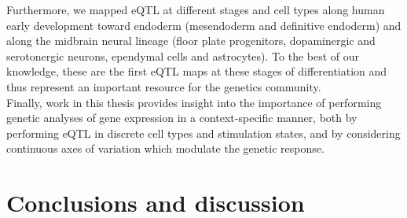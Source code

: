 Furthermore, we mapped eQTL at different stages and cell types along human early development toward endoderm (mesendoderm and definitive endoderm) and along the midbrain neural lineage (floor plate progenitors, dopaminergic and serotonergic neurons, ependymal cells and astrocytes). 
To the best of our knowledge, these are the first eQTL maps at these stages of differentiation and thus represent an important resource for the genetics community. \\

Finally, work in this thesis provides insight into the importance of performing genetic analyses of gene expression in a context-specific manner, both by performing eQTL in discrete cell types and stimulation states, and by considering continuous axes of variation which modulate the genetic response.

\section{Conclusions and discussion}



